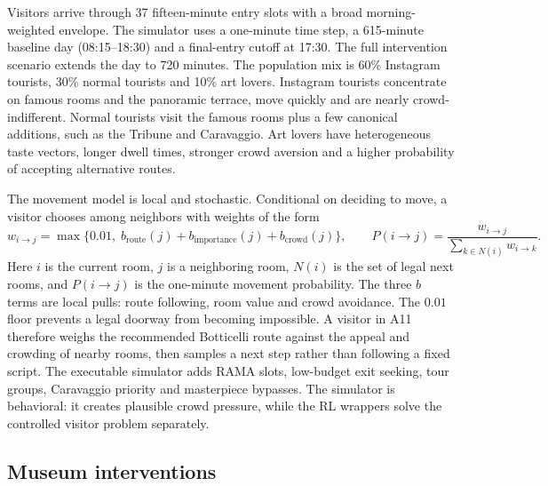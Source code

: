 \documentclass[11pt]{article}
\newcommand{\added}[1]{{\color{green!50!black}#1}}
\begin{document}
Visitors arrive through 37 fifteen-minute entry slots with a broad morning-weighted envelope. The
simulator uses a one-minute time step, a 615-minute baseline day (08:15--18:30) and a final-entry
cutoff at 17:30. The full intervention scenario extends the day to 720 minutes. The population mix is
60\% Instagram tourists, 30\% normal tourists and 10\% art lovers. Instagram tourists concentrate on
famous rooms and the panoramic terrace, move quickly and are nearly crowd-indifferent. Normal
tourists visit the famous rooms plus a few canonical additions, such as the Tribune and Caravaggio.
Art lovers have heterogeneous taste vectors, longer dwell times, stronger crowd aversion and a higher
probability of accepting alternative routes.

The movement model is local and stochastic. Conditional on deciding to move, a visitor chooses among
neighbors with weights of the form
\[
w_{i\to j}=\max\{0.01,\; b_{\text{route}}(j)+b_{\text{importance}}(j)+b_{\text{crowd}}(j)\},
\qquad
P(i\to j)=\frac{w_{i\to j}}{\sum_{k\in N(i)} w_{i\to k}}.
\]
\added{Here $i$ is the current room, $j$ is a neighboring room, $N(i)$ is the set of legal next rooms,
and $P(i\to j)$ is the one-minute movement probability. The three $b$ terms are local pulls: route
following, room value and crowd avoidance. The $0.01$ floor prevents a legal doorway from becoming
impossible. A visitor in A11 therefore weighs the recommended Botticelli route against the appeal and
crowding of nearby rooms, then samples a next step rather than following a fixed script.} The executable simulator adds RAMA
slots, low-budget exit seeking, tour groups, Caravaggio priority and masterpiece bypasses. The
simulator is behavioral: it creates plausible crowd pressure, while the RL wrappers solve the
controlled visitor problem separately.

\subsection{Museum interventions}
\end{document}
